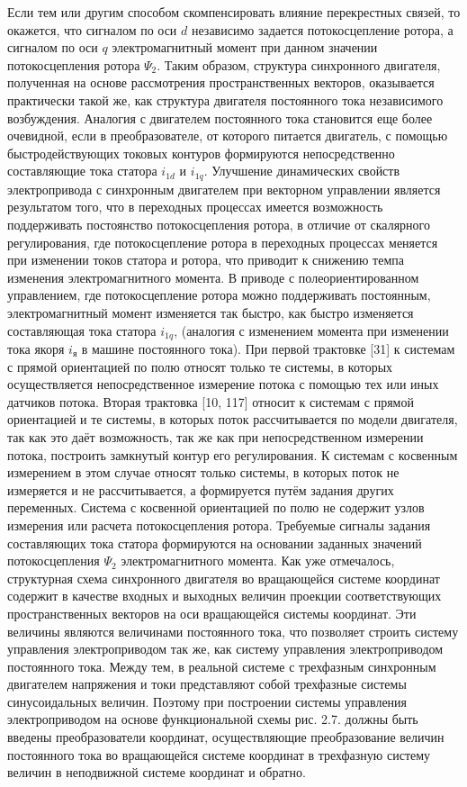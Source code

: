 Если тем или другим способом скомпенсировать влияние перекрестных связей, то окажется, что сигналом по оси $d$ независимо задается потокосцепление ротора, а сигналом по оси $q$ электромагнитный момент при данном значении потокосцепления ротора ${\Psi }_{2}$. 
Таким образом, структура синхронного двигателя, полученная на основе рассмотрения пространственных векторов, оказывается практически такой же, как структура двигателя постоянного тока независимого возбуждения.
Аналогия с двигателем постоянного тока становится еще более очевидной, если в преобразователе, от которого питается двигатель, с помощью быстродействующих токовых контуров формируются непосредственно составляющие тока статора $i_{1 d}$ и $i_{1 q}$. Улучшение динамических свойств электропривода с синхронным двигателем при векторном управлении является результатом того, что в переходных процессах имеется возможность поддерживать постоянство потокосцепления ротора, в отличие от скалярного регулирования, где потокосцепление ротора в переходных процессах меняется при изменении токов статора и ротора, что приводит к снижению темпа изменения электромагнитного момента. В приводе с полеориентированном управлением, где потокосцепление ротора можно поддерживать постоянным, электромагнитный момент изменяется так быстро, как быстро изменяется составляющая тока статора $i_{1 q}$, (аналогия с изменением момента при изменении тока якоря $i_{\text{я}}$ в машине постоянного тока). 
При первой трактовке [31] к системам с прямой ориентацией по полю относят только те системы, в которых осуществляется непосредственное измерение потока с помощью тех или иных датчиков потока. Вторая трактовка [10, 117] относит к системам с прямой ориентацией и те системы, в которых поток рассчитывается по модели двигателя, так как это даёт возможность, так же как при непосредственном измерении потока, построить замкнутый контур его регулирования. К системам с косвенным измерением в этом случае относят только системы, в которых поток не измеряется и не рассчитывается, а формируется путём задания других переменных. 
Система с косвенной ориентацией по полю не содержит узлов измерения или расчета потокосцепления ротора. Требуемые сигналы задания составляющих тока статора формируются на основании заданных значений потокосцепления ${\Psi }_{2}$ электромагнитного момента. 
Как уже отмечалось, структурная схема синхронного двигателя во вращающейся системе координат содержит в качестве входных и выходных величин проекции соответствующих пространственных векторов на оси вращающейся системы координат. Эти величины являются величинами постоянного тока, что позволяет строить систему управления электроприводом так же, как систему управления электроприводом постоянного тока. Между тем, в реальной системе с трехфазным синхронным двигателем напряжения и токи представляют собой трехфазные системы синусоидальных величин. Поэтому при построении системы управления электроприводом на основе функциональной схемы рис. 2.7. должны быть введены преобразователи координат, осуществляющие преобразование величин постоянного тока во вращающейся системе координат в трехфазную систему величин в неподвижной системе координат и обратно.

